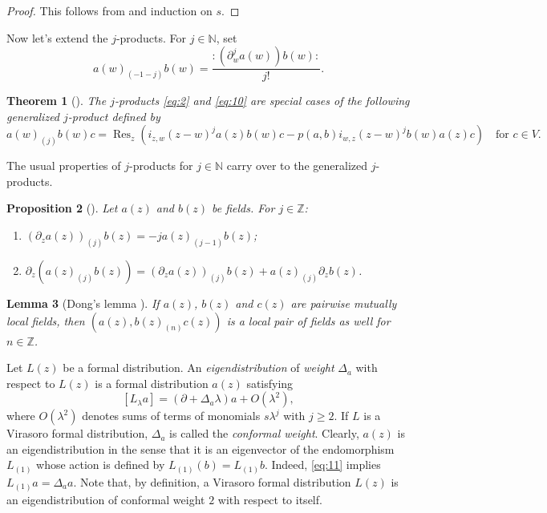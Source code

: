 \documentclass[a4paper, 12pt, reqno]{amsart}
\newtheorem{theorem}{Theorem}[section]
\newtheorem{lemma}[theorem]{Lemma}
\newtheorem{proposition}[theorem]{Proposition}
\theoremstyle{remark}
\numberwithin{equation}{subsection}
\DeclareMathOperator{\Res}{Res}
\begin{document}
\begin{proof}
  This follows from  and induction on $s$.
\end{proof}

Now let's extend the $j$-products.
For $j \in \mathbb{N}$, set
\begin{equation}
  \label{eq:10}
  a(w)_{(-1 - j)}b(w) = \frac{:(\partial^j_wa(w))b(w):}{j!}.
\end{equation}

\begin{theorem}[{\cite[Proposition 3.4.3]{nozaradan_introduction_2008}}]
  \label{thr:12}
  The $j$-products \eqref{eq:2} and \eqref{eq:10} are special cases of the following generalized $j$-product defined by
  \begin{equation*}
    a(w)_{(j)}b(w)c = \Res_z(i_{z, w}(z - w)^ja(z)b(w)c - p(a, b)i_{w, z}(z - w)^jb(w)a(z)c) \quad \text{for }c \in V.
  \end{equation*}
\end{theorem}

The usual properties of $j$-products for $j \in \mathbb{N}$ carry over to the generalized $j$-products.

\begin{proposition}[{\cite[Proposition 3.4.4]{nozaradan_introduction_2008}}]
  \label{prp:7}
  Let $a(z)$ and $b(z)$ be fields.
  For $j \in \mathbb{Z}$:
  \begin{enumerate}
  \item $(\partial_za(z))_{(j)}b(z) = -ja(z)_{(j - 1)}b(z)$;
  \item $\partial_z(a(z)_{(j)}b(z)) = (\partial_za(z))_{(j)}b(z) + a(z)_{(j)}\partial_zb(z)$.
  \end{enumerate}
\end{proposition}

\begin{lemma}[Dong's lemma {\cite[Lemma 3.2]{kac_vertex_1998}}]
  \label{lmm:4}
  If $a(z)$, $b(z)$ and $c(z)$ are pairwise mutually local fields, then $(a(z), b(z)_{(n)}c(z))$ is a local pair of fields as well for $n \in \mathbb{Z}$.
\end{lemma}

Let $L(z)$ be a formal distribution.
An \emph{eigendistribution} of \emph{weight} $\Delta_a$ with respect to $L(z)$ is a formal distribution $a(z)$ satisfying
\begin{equation}
  \label{eq:11}
  [L_{\lambda}a] = (\partial + \Delta_a\lambda)a + O(\lambda^2),
\end{equation}
where $O(\lambda^2)$ denotes sums of terms of monomials $s\lambda^j$ with $j \ge 2$.
If $L$ is a Virasoro formal distribution, $\Delta_a$ is called the \emph{conformal weight}.
Clearly, $a(z)$ is an eigendistribution in the sense that it is an eigenvector of the endomorphism $L_{(1)}$ whose action is defined by $L_{(1)}(b) = L_{(1)}b$.
Indeed, \eqref{eq:11} implies $L_{(1)}a = \Delta_aa$.
Note that, by definition, a Virasoro formal distribution $L(z)$ is an eigendistribution of conformal weight $2$ with respect to itself.
\end{document}
